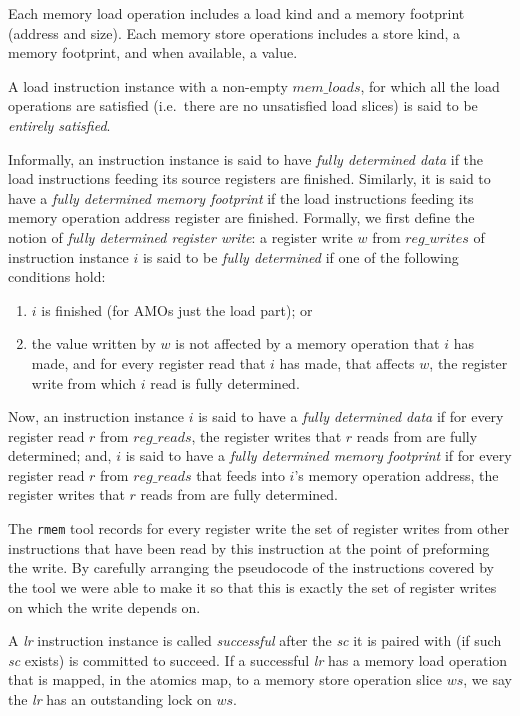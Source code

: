 Each memory load operation includes a load kind and a memory footprint (address and size).
Each memory store operations includes a store kind, a memory footprint, and when available, a value.

A load instruction instance with a non-empty $mem\_loads$, for which all the load operations are satisfied (i.e.~there are no unsatisfied load slices) is said to be {\it entirely satisfied}.

Informally, an instruction instance is said to have {\it fully determined data} if the load instructions feeding its source registers are finished.
Similarly, it is said to have a {\it fully determined memory footprint} if the load instructions feeding its memory operation address register are finished.
%
Formally, we first define the notion of {\it fully determined register write}: a register write $w$ from $reg\_writes$ of instruction instance $i$ is said to be {\it fully determined} if one of the following conditions hold:
\begin{enumerate}
\item $i$ is finished (for AMOs just the load part); or
\item the value written by $w$ is not affected by a memory operation that $i$ has made, and for every register read that $i$ has made, that affects $w$, the register write from which $i$ read is fully determined.
\end{enumerate}
Now, an instruction instance $i$ is said to have a {\it fully determined data} if for every register read $r$ from $reg\_reads$, the register writes that $r$ reads from are fully determined;
and, $i$ is said to have a {\it fully determined memory footprint} if for every register read $r$ from $reg\_reads$ that feeds into $i$'s memory operation address, the register writes that $r$ reads from are fully determined.
\begin{commentary}
The {\tt rmem} tool records for every register write the set of register writes from other instructions that have been read by this instruction at the point of preforming the write.
By carefully arranging the pseudocode of the instructions covered by the tool we were able to make it so that this is exactly the set of register writes on which the write depends on.
\end{commentary}

A {\em lr} instruction instance is called {\em successful} after the {\em sc} it is paired with (if such {\em sc} exists) is committed to succeed.
If a successful {\em lr} has a memory load operation that is mapped, in the atomics map, to a memory store operation slice $ws$, we say the {\em lr} has an outstanding lock on $ws$. 


